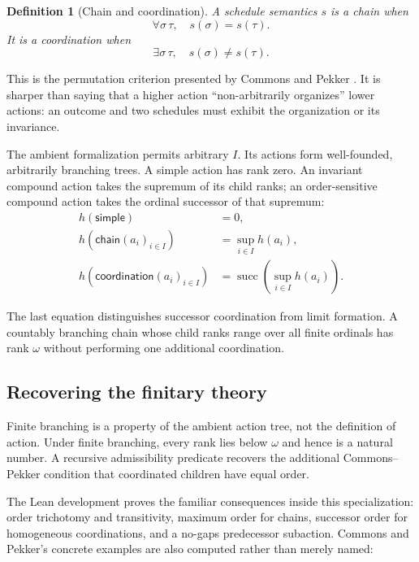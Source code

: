 \documentclass[11pt]{article}
\newtheorem{definition}{Definition}[section]
\theoremstyle{remark}
\begin{document}
\begin{definition}[Chain and coordination]
A schedule semantics $s$ is a \emph{chain} when
\[
  \forall \sigma\,\tau,\quad s(\sigma)=s(\tau).
\]
It is a \emph{coordination} when
\[
  \exists \sigma\,\tau,\quad s(\sigma)\ne s(\tau).
\]
\end{definition}

This is the permutation criterion presented by Commons and Pekker
\cite{commonspekker2008}.  It is sharper than saying that a higher action
``non-arbitrarily organizes'' lower actions: an outcome and two schedules must
exhibit the organization or its invariance.

The ambient formalization permits arbitrary $I$.  Its actions form
well-founded, arbitrarily branching trees.  A simple action has rank zero.  An
invariant compound action takes the supremum of its child ranks; an
order-sensitive compound action takes the ordinal successor of that supremum:
\[
\begin{aligned}
 h(\mathsf{simple}) &= 0,\\
 h(\mathsf{chain}(a_i)_{i\in I}) &= \sup_{i\in I} h(a_i),\\
 h(\mathsf{coordination}(a_i)_{i\in I})
   &= \operatorname{succ}\!\left(\sup_{i\in I} h(a_i)\right).
\end{aligned}
\]

The last equation distinguishes successor coordination from limit formation.
A countably branching chain whose child ranks range over all finite ordinals
has rank $\omega$ without performing one additional coordination.

\subsection{Recovering the finitary theory}

Finite branching is a property of the ambient action tree, not the definition
of action.  Under finite branching, every rank lies below $\omega$ and hence is
a natural number.  A recursive admissibility predicate recovers the additional
Commons--Pekker condition that coordinated children have equal order.

The Lean development proves the familiar consequences inside this
specialization: order trichotomy and transitivity, maximum order for chains,
successor order for homogeneous coordinations, and a no-gaps predecessor
subaction.  Commons and Pekker's concrete examples are also computed rather
than merely named:
\end{document}
